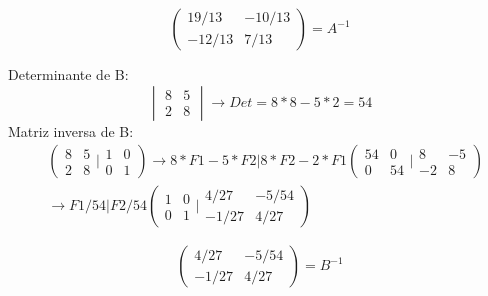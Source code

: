\documentclass{article}
\begin{document}
\begin{enumerate}
\begin{equation*}
    \left(
    \begin{array}{cc}
    19/13 & -10/13 \\
    -12/13 & 7/13
    \end{array}
    \right) = A^{-1}
\end{equation*}
    


 Determinante de B:\begin{equation*}
    \begin{vmatrix}
    8 & 5 \\
    2 & 8
    \end{vmatrix}   \rightarrow Det=
    8*8 - 5*2 = 54 
\end{equation*}
Matriz inversa de B:
\begin{equation*}
\begin{split} 
    & \left(
    \begin{array}{cc}
    8 & 5 \\
    2 & 8
    \end{array} \bigg\vert  \begin{array}{cc}
    1 & 0 \\
    0 & 1
    \end{array}  \right)
     \rightarrow  8*F1-5*F2 \vert 8*F2-2*F1
     \left(
    \begin{array}{cc}
    54 & 0 \\
    0 & 54
    \end{array}\bigg\vert  \begin{array}{cc}
    8 & -5 \\
    -2 & 8
    \end{array}
    \right) \\
    & \rightarrow  F1/54 \vert F2/54 
    \left( \begin{array}{cc}
    1 & 0 \\
    0 & 1
    \end{array}\bigg\vert  \begin{array}{cc}
    4/27 & -5/54 \\
    -1/27 & 4/27
    \end{array}
    \right)
\end{split}
\end{equation*}

\begin{equation*}
    \left( \begin{array}{cc}
    4/27 & -5/54 \\
    -1/27 & 4/27
    \end{array}
    \right)= B^{-1}
\end{equation*}
    



\end{enumerate}
\end{document}
